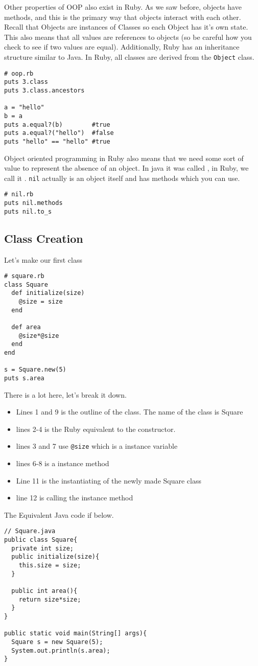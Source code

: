 \documentclass[main.tex]{subfiles}
\begin{document}
Other properties of OOP also exist in Ruby. 
As we saw before, objects have methods, and this is the primary way that objects interact with each other. 
Recall that Objects are instances of Classes so each Object has it's own state.
This also means that all values are references to objects (so be careful how you check to see if two values are equal).
Additionally, Ruby has an inheritance structure similar to Java. 
In Ruby, all classes are derived from the \texttt{Object} class. 

\begin{lstlisting}[style=MyRubyStyle]
# oop.rb
puts 3.class
puts 3.class.ancestors

a = "hello"
b = a
puts a.equal?(b)        #true
puts a.equal?("hello")  #false
puts "hello" == "hello" #true

\end{lstlisting}

Object oriented programming in Ruby also means that we need some sort of value to represent the absence of an object. In java it was called , in Ruby, we call it . \texttt{nil} actually is an object itself and has methods which you can use. 
\begin{lstlisting}[style=MyRubyStyle]
# nil.rb
puts nil.methods
puts nil.to_s
\end{lstlisting}

\subsection{Class Creation}
Let's make our first class
\begin{lstlisting}[style=MyRubyStyle]
# square.rb
class Square
  def initialize(size)
    @size = size
  end
 
  def area
    @size*@size
  end
end 
 
s = Square.new(5)
puts s.area
\end{lstlisting}
There is a lot here, let's break it down. 
\begin{itemize}
    \item Lines 1 and 9 is the outline of the class. The name of the class is Square
    \item lines 2-4 is the Ruby equivalent to the constructor. 
    \item lines 3 and 7 use \texttt{@size} which is a instance variable
    \item lines 6-8 is a instance method
    \item Line 11 is the instantiating of the newly made Square class
    \item line 12 is calling the instance method
\end{itemize}
The Equivalent Java code if below. 
\newpage\begin{lstlisting}[style=MyJavaStyle]
// Square.java
public class Square{
  private int size;
  public initialize(size){
    this.size = size;
  } 
 
  public int area(){
    return size*size;
  }
} 
 
public static void main(String[] args){
  Square s = new Square(5);
  System.out.println(s.area);
}
\end{lstlisting}
\end{document}
